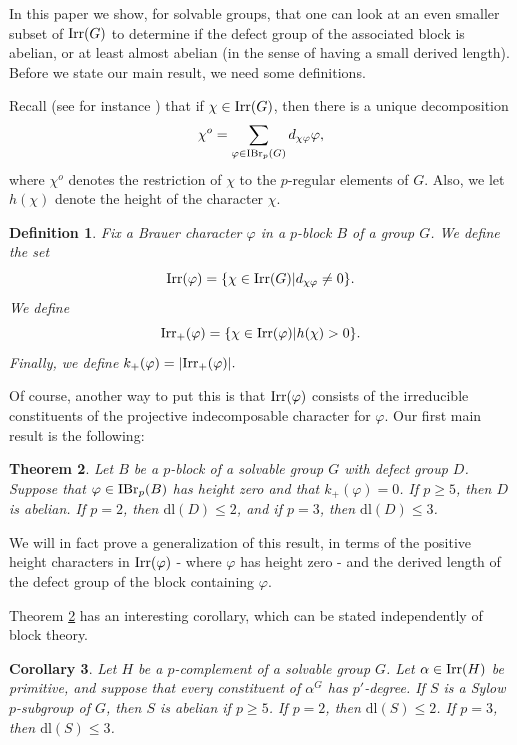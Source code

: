 \documentclass[11pt]{amsart}
\newtheorem{theorem}{Theorem}[section]
\newtheorem{corollary}[theorem]{Corollary}
\newtheorem{definition}[theorem]{Definition}
\newcommand \irr {\textup{Irr}}
\newcommand \ibr {{\textup{IBr}}_p}
\newcommand{\dl}{\mathrm {dl}}
\begin{document}
In this paper we show, for solvable groups, that one can look at an even smaller subset of $\irr(G)$ to determine if  the defect group of the associated block is abelian, or at least almost abelian (in the sense of having a small derived length).  Before we state our main result, we need some definitions.

Recall (see for instance \cite{navarrobook}) that if $\chi \in \irr(G)$, then there is a unique decomposition $$\chi^o = \sum_{\varphi \in \ibr(G)} d_{\chi \varphi} \varphi,$$ where $\chi^o$ denotes the restriction of $\chi$ to the $p$-regular elements of $G$.  Also, we let $h(\chi)$ denote the height of the character $\chi$.

\begin{definition}  Fix a Brauer character $\varphi$ in a $p$-block $B$ of a group $G$.  We define the set $$\irr(\varphi) = \{ \chi \in \irr(G) | d_{\chi \varphi} \neq 0 \}.$$  We define $$\irr_+(\varphi) = \{ \chi \in \irr(\varphi) | h(\chi) > 0  \}.$$    Finally, we define  $k_+(\varphi) = |\irr_+(\varphi)|.$
\end{definition}

Of course, another way to put this is that $\irr(\varphi)$ consists of the irreducible constituents of the projective indecomposable character for $\varphi$.  Our first main result is the following:

\begin{theorem}\label{main1}  Let $B$ be a $p$-block of a solvable group $G$ with defect group $D$.  Suppose that $\varphi \in \ibr(B)$ has height zero and that $k_+(\varphi) = 0$.  If $p \geq 5$, then $D$ is abelian.  If $p = 2$, then $\dl(D) \leq 2$, and if $p = 3$, then $\dl(D) \leq 3$.
\end{theorem}


We will in fact prove a generalization of this result, in terms of the positive height characters in $\irr(\varphi)$ - where $\varphi$ has height zero - and the derived length of the defect group of the block containing $\varphi$.  

Theorem \ref{main1} has an interesting corollary, which can be stated independently of block theory.

\begin{corollary}\label{primcor}  Let $H$ be a $p$-complement of a solvable group $G$.  Let $\alpha \in \irr(H)$ be primitive, and suppose that every constituent of $\alpha^G$ has $p'$-degree.  If $S$ is a Sylow $p$-subgroup of $G$, then $S$ is abelian if $p \geq 5$.  If $p =2$, then $\dl(S) \leq 2$.  If $p = 3$, then $\dl(S) \leq 3$.
\end{corollary}
\end{document}
